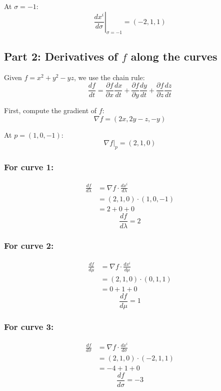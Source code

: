 \documentclass[10pt,twocoloumn]{article}
\begin{document}
At $\sigma = -1$:
\begin{equation*}
\boxed{\left.\frac{dx^i}{d\sigma}\right|_{\sigma=-1} = (-2, 1, 1)}
\end{equation*}

\subsection*{Part 2: Derivatives of $f$ along the curves}

Given $f = x^2 + y^2 - yz$, we use the chain rule:
\begin{equation*}
\frac{df}{dt} = \frac{\partial f}{\partial x}\frac{dx}{dt} + \frac{\partial f}{\partial y}\frac{dy}{dt} + \frac{\partial f}{\partial z}\frac{dz}{dt}
\end{equation*}

First, compute the gradient of $f$:
\begin{equation*}
\nabla f = (2x, 2y - z, -y)
\end{equation*}

At $p = (1, 0, -1)$:
\begin{equation*}
\nabla f|_p = (2, 1, 0)
\end{equation*}

\subsubsection*{For curve 1:}
\begin{align*}
\frac{df}{d\lambda} &= \nabla f \cdot \frac{dx^i}{d\lambda} \\
&= (2, 1, 0) \cdot (1, 0, -1) \\
&= 2 + 0 + 0
\end{align*}
\begin{equation*}
\boxed{\frac{df}{d\lambda} = 2}
\end{equation*}

\subsubsection*{For curve 2:}
\begin{align*}
\frac{df}{d\mu} &= \nabla f \cdot \frac{dx^i}{d\mu} \\
&= (2, 1, 0) \cdot (0, 1, 1) \\
&= 0 + 1 + 0
\end{align*}
\begin{equation*}
\boxed{\frac{df}{d\mu} = 1}
\end{equation*}

\subsubsection*{For curve 3:}
\begin{align*}
\frac{df}{d\sigma} &= \nabla f \cdot \frac{dx^i}{d\sigma} \\
&= (2, 1, 0) \cdot (-2, 1, 1) \\
&= -4 + 1 + 0
\end{align*}
\begin{equation*}
\boxed{\frac{df}{d\sigma} = -3}
\end{equation*}
\end{document}
